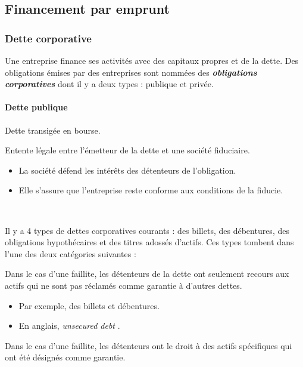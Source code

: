 \documentclass[10pt, french]{article}
\begin{document}
\begin{multicols*}{2}
\columnbreak
\subsection{Financement par emprunt}
\subsubsection{Dette corporative}
Une entreprise finance ses activités avec des capitaux propres et de la dette. Des obligations émises par des entreprises sont nommées des \textbf{\textit{obligations corporatives}} dont il y a deux types : publique et privée.

\paragraph{Dette publique} Dette transigée en bourse.

\begin{definitionNOHFILL}[Fiducie]
Entente légale entre l'émetteur de la dette et une société fiduciaire.
\begin{itemize}
	\item	La société défend les intérêts des détenteurs de l'obligation.
	\item	Elle s'assure que l'entreprise reste conforme aux conditions de la fiducie.
\end{itemize}
\end{definitionNOHFILL}

\

Il y a 4 types de dettes corporatives courants : des billets, des débentures, des obligations hypothécaires et des titres adossés d'actifs. Ces types tombent dans l'une des deux catégories suivantes : 

\begin{definitionNOHFILLprop}
Dans le cas d'une faillite, les détenteurs de la dette ont seulement recours aux actifs qui ne sont pas réclamés comme garantie à d'autres dettes.

\begin{itemize}
	\item	Par exemple, des billets et débentures.
	\item	En anglais, \og \textit{unsecured debt} \fg{}.
\end{itemize}
\end{definitionNOHFILLprop}

\begin{definitionNOHFILLprop}
Dans le cas d'une faillite, les détenteurs ont le droit à des actifs spécifiques qui ont été désignés comme garantie.


\end{definitionNOHFILLprop}
\end{multicols*}
\end{document}
